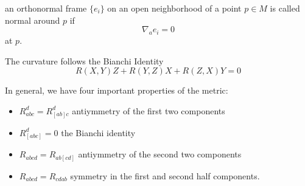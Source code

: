 \documentclass[../main.tex]{subfiles}
\begin{document}
\begin{defn}
    an orthonormal frame $\{e_i\}$ on an open neighborhood of a point $p\in M$
    is called normal around $p$ if
    \[
        \nabla_ae_i = 0
    \]
    at $p$.
\end{defn}

The curvature follows the Bianchi Identity
\[
    R(X,Y)Z + R(Y,Z)X + R(Z,X)Y = 0
\]

In general, we have four important properties of the metric:
\begin{itemize}
    \item $R_{abc}^d = R_{[ab]c}^d$ antiymmetry of the first two components
    \item $R_{[abc]}^d = 0$ the Bianchi identity
    \item $R_{abcd} = R_{ab[cd]}$ antiymmetry of the second two components
    \item $R_{abcd} = R_{cdab}$ symmetry in the first and second half
        components.
\end{itemize}
\end{document}
